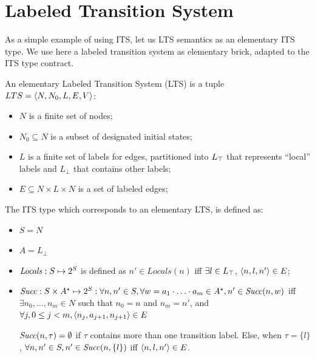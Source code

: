 \section{Labeled Transition System}
\label{ss:ltstype}

As a simple example of using ITS, let us LTS semantics as an elementary ITS type.
We use here a labeled transition system as elementary brick, adapted to the ITS type contract.

\begin{definition}
\label{def:ltstype}
An elementary Labeled Transition System (LTS) is a tuple \\
$LTS = \langle {N,N_0,L,E,V} \rangle$:
\begin{itemize}
\item $N$ is a finite set of nodes;
\item $N_0 \subseteq N$ is a subset of designated initial states;
\item $L$ is a finite set of labels for edges, partitioned into $L_{\top}$ that represents ``local'' labels and $L_\bot$ that contains other labels;
\item $E \subseteq N \times L \times N$ is a set of labeled edges;
\end{itemize}
\end{definition}

The ITS type which corresponds to an elementary LTS, is defined as:
\begin{itemize}
\item $S = N$
\item $A = L_\bot$
\item $\mathit{Locals}: S \mapsto 2^S$ is defined as $n' \in \mathit{Locals}(n)$ iff $\exists l \in L_{\top}$, $\langle {n,l,n'} \rangle \in E$;
\item $\mathit{Succ}{}: S \times  A^\star  \mapsto 2^S: \forall n,n' \in S, \forall w= a_1\cdot\ldots\cdot a_m \in A^\star, n' \in \mathit{Succ}{}(n,w)$ iff
$\exists n_0,\ldots, n_m \in N$ such that $n_0 = n$ and $n_m = n'$, and $\forall j, 0 \leq j < m, \langle {n_j,a_{j+1},n_{j+1}} \rangle \in E$

$\mathit{Succ}{}(n,\tau) = \emptyset$ if $\tau$ contains more than one transition label.
Else, when $\tau= \{l\}$, $\forall n,n' \in S, n' \in \mathit{Succ}{}(n,\{l\})$ iff $\langle {n,l,n'} \rangle \in E$.
\end{itemize}

